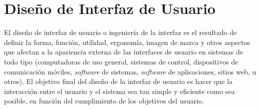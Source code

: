 %
%
%
%

\section{Dise\~no de Interfaz de Usuario}

El diseño de interfaz de usuario o ingeniería de la interfaz es el resultado de definir la forma, función, utilidad, ergonomía, imagen de marca y otros aspectos que afectan a la apariencia externa de las interfaces de usuario en sistemas de todo tipo (computadoras de uso general, sistemas de control, dispositivos de comunicación móviles, \textit{software} de sistemas, \textit{software} de aplicaciones, sitios web, u otros). El objetivo final del diseño de la interfaz de usuario es hacer que la interacción entre el usuario y el sistema sea tan simple y eficiente como sea posible, en función del cumplimiento de los objetivos del usuario.

